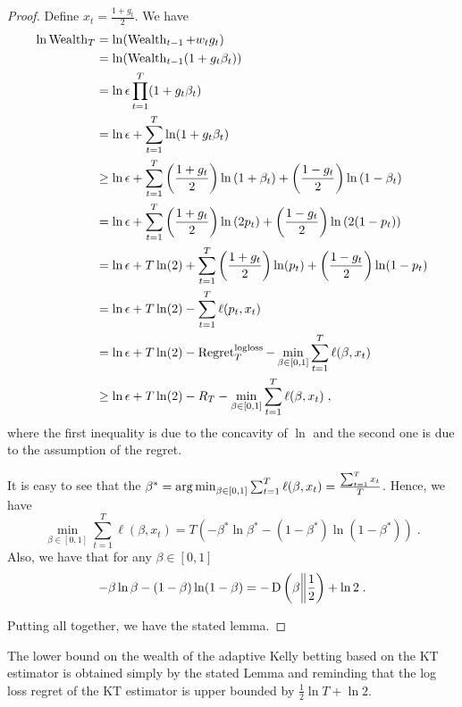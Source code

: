 \begin{proof}
Define $x_t=\tfrac{1+g_t}{2}$. We have
\begin{align*}
\ln \operatorname{Wealth}_T
& = \ln (\operatorname{Wealth}_{t-1} + w_t g_t) \\
& = \ln (\operatorname{Wealth}_{t-1}(1 + g_t \beta_t))\\
& = \ln \epsilon \prod_{t=1}^T (1 + g_t\beta_t) \\
& = \ln \epsilon + \sum_{t=1}^T \ln (1 + g_t\beta_t)\\
& \ge \ln \epsilon +  \sum_{t=1}^T \left( \frac{1+g_t}{2} \right) \ln \left(1 + \beta_t\right) + \left( \frac{1-g_t}{2} \right) \ln \left(1 - \beta_t \right) \\
& =  \ln \epsilon + \sum_{t=1}^T \left( \frac{1+g_t}{2} \right) \ln \left(2p_t \right) + \left( \frac{1-g_t}{2} \right) \ln \left(2 (1 - p_t) \right) \\
& =  \ln \epsilon + T \ln(2) + \sum_{t=1}^T \left( \frac{1+g_t}{2} \right) \ln (p_t) + \left( \frac{1-g_t}{2} \right) \ln (1 - p_t) \\
& =  \ln \epsilon + T \ln(2) - \sum_{t=1}^T \ell(p_t, x_t) \\
& =  \ln \epsilon + T \ln(2) - \operatorname{Regret}^{\mathrm{logloss}}_T - \min_{\beta \in [0,1]} \sum_{t=1}^T \ell(\beta,x_t) \\
& \ge  \ln \epsilon + T \ln(2) - R_T - \min_{\beta \in [0,1]} \sum_{t=1}^T \ell(\beta,x_t) \; ,
\end{align*}
where the first inequality is due to the concavity of $\ln$ and the second one
is due to the assumption of the regret.

It is easy to see that the $\beta^*=\operatorname*{arg\,min}_{\beta \in [0,1]} \sum_{t=1}^T
\ell(\beta,x_t)=\tfrac{\sum_{t=1}^T x_t}{T}$. Hence, we have
\[
\min_{\beta \in [0,1]} \sum_{t=1}^T \ell(\beta,x_t) = T \left( - \beta^* \ln \beta^* - (1-\beta^*) \ln (1-\beta^*)\right) \; .
\]
Also, we have that for any $\beta \in [0,1]$
\[
- \beta \ln \beta - (1-\beta) \ln (1-\beta) = - \operatorname{D}\left({\beta}\middle\|{\frac{1}{2}}\right) + \ln 2 \; .
\]

Putting all together, we have the stated lemma.
\end{proof}

The lower bound on the wealth of the adaptive Kelly betting based on the KT
estimator is obtained simply by the stated Lemma and reminding that the log
loss regret of the KT estimator is upper bounded by $\frac{1}{2}\ln T + \ln 2$.
